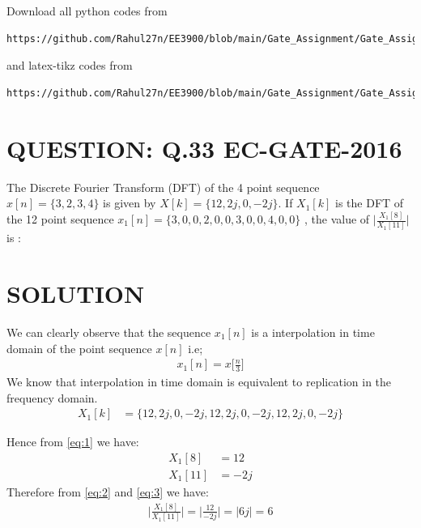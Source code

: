 \documentclass[journal,12pt,twocolumn]{IEEEtran}
\begin{document}
Download all python codes from 
\begin{lstlisting}
https://github.com/Rahul27n/EE3900/blob/main/Gate_Assignment/Gate_Assignment.py
\end{lstlisting}
%
and latex-tikz codes from 
%
\begin{lstlisting}
https://github.com/Rahul27n/EE3900/blob/main/Gate_Assignment/Gate_Assignment.tex
\end{lstlisting}

\vspace{0.5cm}
\section{QUESTION: Q.33 EC-GATE-2016}

The Discrete Fourier Transform (DFT) of the 4 point sequence $ x[n] =\{3, 2, 3, 4\}$ is given by $ X[k] =\{12, 2j, 0, -2j\}$. If $X_{1}[k]$ is the DFT of the 12 point sequence $ x_{1}[n] =\{3, 0, 0, 2, 0, 0, 3, 0, 0, 4, 0, 0\}$ , the value of $\big|{\frac{X_{1}[8]}{X_{1}[11]}}\big|$ is :
\section{SOLUTION}
\vspace{0.5cm}
We can clearly observe that the sequence $x_{1}[n]$ is a interpolation in time domain of the point sequence $x[n]$ i.e;
\begin{align}
x_{1}[n] = x\Big[\frac{n}{3}\Big]
\end{align}
We know that interpolation in time domain is equivalent to replication in the frequency domain. %
\begin{align}
 X_{1}[k] &=\{12, 2j, 0, -2j,12, 2j, 0, -2j,12, 2j, 0, -2j\}\label{eq:1}
\end{align}

Hence from \eqref{eq:1} we have:
\begin{align}
X_{1}[8] &= 12\label{eq:2}
\\ X_{1}[11] &= -2j\label{eq:3}
\end{align}
Therefore from \eqref{eq:2} and \eqref{eq:3} we have:
\begin{align}
\Big|{\frac{X_{1}[8]}{X_{1}[11]}}\Big| = \Big|{\frac{12}{-2j}}\Big| =\big|6j\big| = 6
\end{align}
\end{document}
